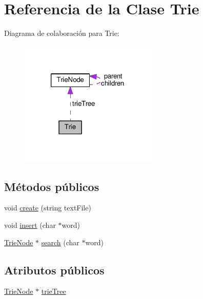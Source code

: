 \hypertarget{class_trie}{\section{Referencia de la Clase Trie}
\label{class_trie}
}


Diagrama de colaboración para Trie\-:\nopagebreak
\begin{figure}[H]
\begin{center}
\leavevmode
\includegraphics[width=187pt]{class_trie__coll__graph}
\end{center}
\end{figure}
\subsection*{Métodos públicos}
\begin{DoxyCompactItemize}
\item 
void \hyperlink{class_trie_aba2fe23150879d718c56e51ab61006d4}{create} (string text\-File)
\item 
void \hyperlink{class_trie_a5951beb416bb09f990126f5bc39aff58}{insert} (char $\ast$word)
\item 
\hyperlink{class_trie_node}{Trie\-Node} $\ast$ \hyperlink{class_trie_ab9777dcdc2c9ccb8fe9080fa1a640109}{search} (char $\ast$word)
\end{DoxyCompactItemize}
\subsection*{Atributos públicos}
\begin{DoxyCompactItemize}
\item 
\hyperlink{class_trie_node}{Trie\-Node} $\ast$ \hyperlink{class_trie_a301aa208fe6fc7abaaf264c117070ed6}{trie\-Tree}
\end{DoxyCompactItemize}



